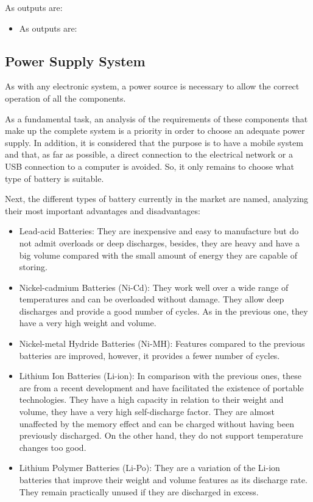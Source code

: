As outputs are:
\begin{itemize}
	\item As outputs are:
\end{itemize}



\subsection{Power Supply System}


As with any electronic system, a power source is necessary to allow the correct operation of all the components. \newline

As a fundamental task, an analysis of the requirements of these components that make up the complete system is a priority in order to choose an adequate power supply. In addition, it is considered that the purpose is to have a mobile system and that, as far as possible, a direct connection to the electrical network or a USB connection to a computer is avoided. So, it only remains to choose what type of battery is suitable.\newline

Next, the different types of battery currently in the market are named, analyzing their most important advantages and disadvantages: 

\begin{itemize}
	\item Lead-acid Batteries: They are inexpensive and easy to manufacture but do not admit overloads or deep discharges, besides, they are heavy and have a big volume compared with the small amount of energy they are capable of storing.
	\item Nickel-cadmium Batteries (Ni-Cd): They work well over a wide range of temperatures and can be overloaded without damage. They allow deep discharges and provide a good number of cycles. As in the previous one, they have a very high weight and volume.
	\item Nickel-metal Hydride Batteries (Ni-MH): Features compared to the previous batteries are improved, however, it provides a fewer number of cycles.
	\item Lithium Ion Batteries (Li-ion): In comparison with the previous ones, these are from a recent development and have facilitated the existence of portable technologies. They have a high capacity in relation to their weight and volume, they have a very high self-discharge factor. They are almost unaffected by the
	memory effect and can be charged without having been previously discharged. On the other hand, they do not support temperature changes too good.
	\item Lithium Polymer Batteries (Li-Po): They are a variation of the Li-ion batteries that improve their weight and volume features as its discharge rate. They remain practically unused if they are discharged in excess.
\end{itemize}

